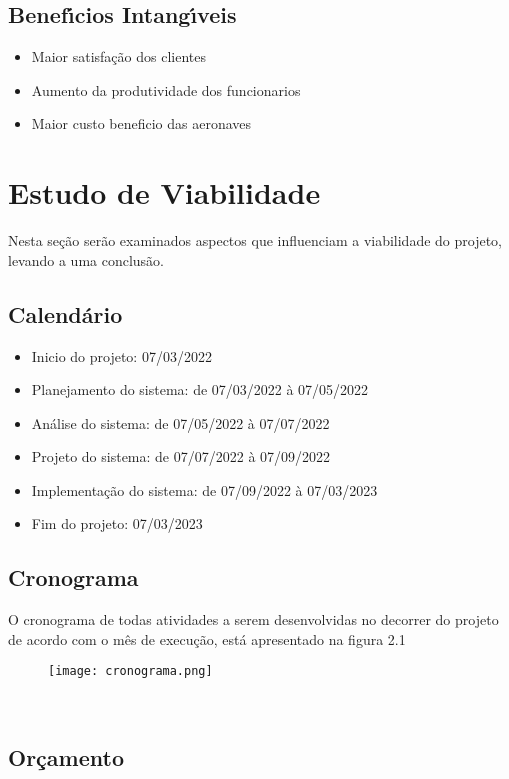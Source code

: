 \subsection{Benef\'{\i}cios Intang\'{\i}veis}
\begin{itemize}
       \item Maior satisfação dos clientes
       \item Aumento da produtividade dos funcionarios
       \item Maior custo beneficio das aeronaves
\end{itemize}


\section{Estudo de Viabilidade}
Nesta seção serão examinados aspectos que influenciam a viabilidade do projeto, levando a uma
conclusão.

\subsection{Calend\'{a}rio }
\begin{itemize}
       \item Inicio do projeto: 07/03/2022
       \item Planejamento do sistema: de 07/03/2022 à 07/05/2022
       \item Análise do sistema: de 07/05/2022 à 07/07/2022
       \item Projeto do sistema: de 07/07/2022 à 07/09/2022
       \item Implementação do sistema: de 07/09/2022 à 07/03/2023
       \item Fim do projeto: 07/03/2023
\end{itemize}

\pagebreak
\subsection{Cronograma}
O cronograma de todas atividades a serem desenvolvidas no decorrer do projeto de acordo com o
mês de execução, está apresentado na figura 2.1
\begin{figure}[h]
       \texttt{[image: cronograma.png]}
\end{figure}
\





\subsection{Or\c{c}amento }

